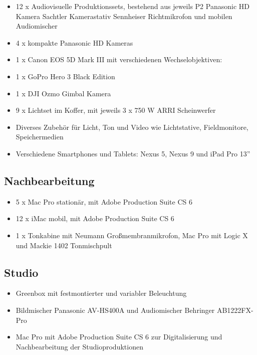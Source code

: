 \begin{itemize}
\tightlist
\item
  12 x Audiovisuelle Produktionssets, bestehend aus jeweils P2 Panasonic
  HD Kamera Sachtler Kamerastativ Sennheiser Richtmikrofon und mobilen
  Audiomischer
\item
  4 x kompakte Panasonic HD Kameras
\item
  1 x Canon EOS 5D Mark III mit verschiedenen Wechselobjektiven:
\item
  1 x GoPro Hero 3 Black Edition
\item
  1 x DJI Ozmo Gimbal Kamera
\item
  9 x Lichtset im Koffer, mit jeweils 3 x 750 W ARRI Scheinwerfer
\item
  Diverses Zubehör für Licht, Ton und Video wie Lichtstative,
  Fieldmonitore, Speichermedien
\item
  Verschiedene Smartphones und Tablets: Nexus 5, Nexus 9 und iPad Pro
  13''
\end{itemize}

\subsection{Nachbearbeitung}\label{nachbearbeitung}

\begin{itemize}
\tightlist
\item
  5 x Mac Pro stationär, mit Adobe Production Suite CS 6
\item
  12 x iMac mobil, mit Adobe Production Suite CS 6
\item
  1 x Tonkabine mit Neumann Großmembranmikrofon, Mac Pro mit Logic X und
  Mackie 1402 Tonmischpult
\end{itemize}

\subsection{Studio}\label{studio}

\begin{itemize}
\tightlist
\item
  Greenbox mit festmontierter und variabler Beleuchtung
\item
  Bildmischer Panasonic AV-HS400A und Audiomischer Behringer
  AB1222FX-Pro
\item
  Mac Pro mit Adobe Production Suite CS 6 zur Digitalisierung und
  Nachbearbeitung der Studioproduktionen
\end{itemize}

